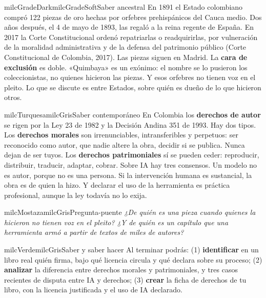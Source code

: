 \documentclass[11pt,letterpaper]{article}
\begin{document}
\begin{softbox}{milcGradeDark}{milcGradeSoft}{Saber ancestral}
En 1891 el Estado colombiano compró 122 piezas de oro hechas por orfebres prehispánicos del Cauca medio. Dos años después, el 4 de mayo de 1893, las regaló a la reina regente de España. En 2017 la Corte Constitucional ordenó repatriarlas o readquirirlas, por vulneración de la moralidad administrativa y de la defensa del patrimonio público (Corte Constitucional de Colombia, 2017). Las piezas siguen en Madrid. La \textbf{cara de exclusión} es doble. «Quimbaya» es un exónimo: el nombre se lo pusieron los coleccionistas, no quienes hicieron las piezas. Y esos orfebres no tienen voz en el pleito. Lo que se discute es entre Estados, sobre quién es dueño de lo que hicieron otros.\par{}
\end{softbox}

\begin{softbox}{milcTurquesa}{milcGris}{Saber contemporáneo}
En Colombia los \textbf{derechos de autor} se rigen por la Ley 23 de 1982 y la Decisión Andina 351 de 1993. Hay dos tipos. Los \textbf{derechos morales} son irrenunciables, intransferibles y perpetuos: ser reconocido como autor, que nadie altere la obra, decidir si se publica. Nunca dejan de ser tuyos. Los \textbf{derechos patrimoniales} sí se pueden ceder: reproducir, distribuir, traducir, adaptar, cobrar. Sobre IA hay tres consensos. Un modelo no es autor, porque no es una persona. Si la intervención humana es sustancial, la obra es de quien la hizo. Y declarar el uso de la herramienta es práctica profesional, aunque la ley todavía no lo exija.
\end{softbox}

\begin{softbox}{milcMostaza}{milcGris}{Pregunta-puente}
\textit{¿De quién es una pieza cuando quienes la hicieron no tienen voz en el pleito? ¿Y de quién es un capítulo que una herramienta armó a partir de textos de miles de autores?}
\end{softbox}

\begin{softbox}{milcVerde}{milcGris}{Saber y saber hacer}
Al terminar podrás: (1) \textbf{identificar} en un libro real quién firma, bajo qué licencia circula y qué declara sobre su proceso; (2) \textbf{analizar} la diferencia entre derechos morales y patrimoniales, y tres casos recientes de disputa entre IA y derechos; (3) \textbf{crear} la ficha de derechos de tu libro, con la licencia justificada y el uso de IA declarado.
\end{softbox}
\end{document}
